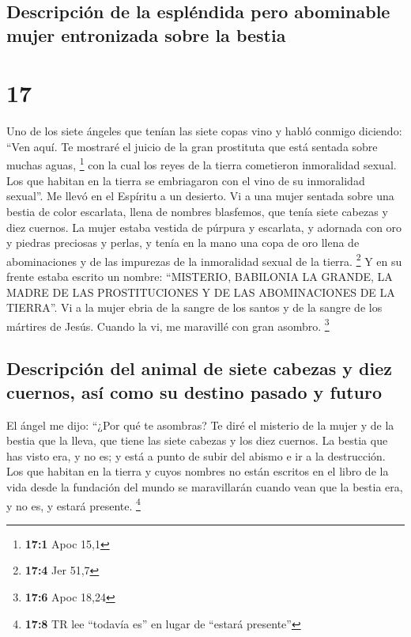 \hypertarget{descripciuxf3n-de-la-espluxe9ndida-pero-abominable-mujer-entronizada-sobre-la-bestia}{%
\subsection{Descripción de la espléndida pero abominable mujer
entronizada sobre la
bestia}\label{descripciuxf3n-de-la-espluxe9ndida-pero-abominable-mujer-entronizada-sobre-la-bestia}}

\hypertarget{section-16}{%
\section{17}\label{section-16}}

 Uno de los siete ángeles que tenían las siete copas vino
y habló conmigo diciendo: ``Ven aquí. Te mostraré el juicio de la gran
prostituta que está sentada sobre muchas aguas, \footnote{\textbf{17:1}
  Apoc 15,1}  con la cual los reyes de la tierra
cometieron inmoralidad sexual. Los que habitan en la tierra se
embriagaron con el vino de su inmoralidad sexual''.  Me
llevó en el Espíritu a un desierto. Vi a una mujer sentada sobre una
bestia de color escarlata, llena de nombres blasfemos, que tenía siete
cabezas y diez cuernos.  La mujer estaba vestida de
púrpura y escarlata, y adornada con oro y piedras preciosas y perlas, y
tenía en la mano una copa de oro llena de abominaciones y de las
impurezas de la inmoralidad sexual de la tierra. \footnote{\textbf{17:4}
  Jer 51,7}  Y en su frente estaba escrito un nombre:
``MISTERIO, BABILONIA LA GRANDE, LA MADRE DE LAS PROSTITUCIONES Y DE LAS
ABOMINACIONES DE LA TIERRA''.  Vi a la mujer ebria de la
sangre de los santos y de la sangre de los mártires de Jesús. Cuando la
vi, me maravillé con gran asombro. \footnote{\textbf{17:6} Apoc 18,24}

\hypertarget{descripciuxf3n-del-animal-de-siete-cabezas-y-diez-cuernos-asuxed-como-su-destino-pasado-y-futuro}{%
\subsection{Descripción del animal de siete cabezas y diez cuernos, así
como su destino pasado y
futuro}\label{descripciuxf3n-del-animal-de-siete-cabezas-y-diez-cuernos-asuxed-como-su-destino-pasado-y-futuro}}

 El ángel me dijo: ``¿Por qué te asombras? Te diré el
misterio de la mujer y de la bestia que la lleva, que tiene las siete
cabezas y los diez cuernos.  La bestia que has visto era,
y no es; y está a punto de subir del abismo e ir a la destrucción. Los
que habitan en la tierra y cuyos nombres no están escritos en el libro
de la vida desde la fundación del mundo se maravillarán cuando vean que
la bestia era, y no es, y estará presente. \footnote{\textbf{17:8} TR
  lee ``todavía es'' en lugar de ``estará presente''}


